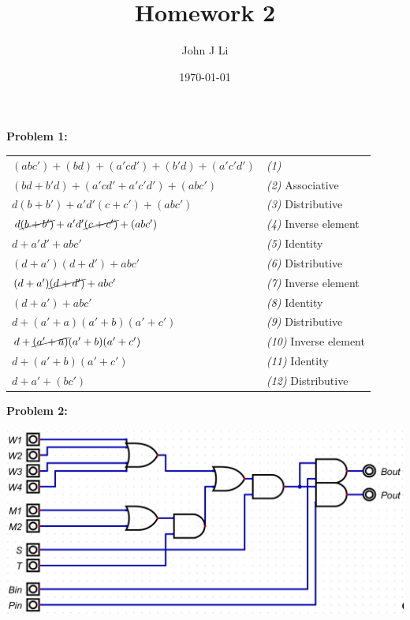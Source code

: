 \documentclass{article}
\title{Homework 2}
\date{\today}
\author{John J Li}
\begin{document}
    \maketitle
    \newpage

    \textbf{Problem 1:}

    \begin{center}
        \begin{tabularx} {\textwidth} {
            >{\raggedright\arraybackslash}X
            >{\raggedright\arraybackslash}X }
    
            $(abc') + (bd) + (a'cd') + (b'd) + (a'c'd')$ & \emph{(1)} \\
            $(bd+b'd) + (a'cd'+a'c'd') + (abc')$ & \emph{(2)} Associative \\
            $d(b+b') + a'd'(c+c') + (abc')$ & \emph{(3)} Distributive \\
            $d\cancel{(b+b')} + a'd'\cancel{(c+c')} + (abc')$ & \emph{(4)} Inverse element \\
            $d + a'd' + abc'$ & \emph{(5)} Identity \\
            $(d+a')(d+d') + abc'$ & \emph{(6)} Distributive \\
            $(d+a')\cancel{(d+d')} + abc'$ & \emph{(7)} Inverse element \\
            $(d+a') + abc'$ & \emph{(8)} Identity \\
            $d + (a'+a)(a'+b)(a'+c')$ & \emph{(9)} Distributive \\
            $d + \cancel{(a'+a)}(a'+b)(a'+c')$ & \emph{(10)} Inverse element \\
            $d + (a'+b)(a'+c')$ & \emph{(11)} Identity \\
            $d + a'+(bc')$ & \emph{(12)} Distributive \\
    
        \end{tabularx}
    \end{center}


    \textbf{Problem 2:}

    \begin{center}
        \includegraphics[width=\linewidth]{q2.jpg}
    \end{center}
\end{document}
